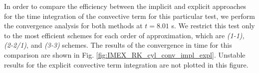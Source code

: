 

In order to compare the efficiency between the implicit and explicit approaches for the time integration of the convective term for this particular test, we perform the convergence analysis for both methods at $t=8.01$ s. We restrict this test only to the most efficient schemes for each order of approximation, which are \textit{(1-1), (2-2/1)}, and \textit{(3-3)} schemes. %
The results of the convergence in time for this comparison are shown in Fig. \ref{fig:IMEX_RK_cyl_conv_impl_expl}. Unstable results for the explicit convective term integration are not plotted in this figure.

